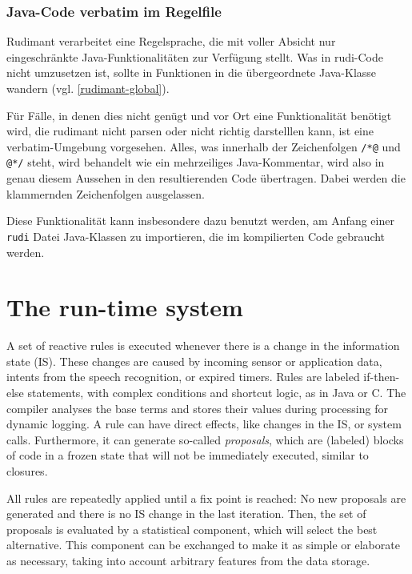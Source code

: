 \subsubsection{Java-Code verbatim im Regelfile} \label{sec:rudi-verbatim}

Rudimant verarbeitet eine Regelsprache, die mit voller Absicht nur
eingeschränkte Java-Funktionalitäten zur Verfügung stellt. Was in rudi-Code
nicht umzusetzen ist, sollte in Funktionen in die übergeordnete Java-Klasse
wandern (vgl. \ref{rudimant-global}).

Für Fälle, in denen dies nicht genügt und vor Ort eine Funktionalität benötigt
wird, die rudimant nicht parsen oder nicht richtig darstelllen kann, ist eine
verbatim-Umgebung vorgesehen. Alles, was innerhalb der Zeichenfolgen \verb|/*@|
und \verb|@*/| steht, wird behandelt wie ein mehrzeiliges Java-Kommentar, wird
also in genau diesem Aussehen in den resultierenden Code übertragen. Dabei
werden die klammernden Zeichenfolgen ausgelassen.

Diese Funktionalität kann insbesondere dazu benutzt werden, am Anfang einer
\texttt{rudi} Datei Java-Klassen zu importieren, die im kompilierten Code
gebraucht werden.

\section{The run-time system}

A set of reactive rules is executed whenever there is a change in the
information state (IS). These changes are caused by incoming sensor or
application data, intents from the speech recognition, or expired timers.
Rules are labeled if-then-else statements, with complex conditions and shortcut
logic, as in Java or C. The compiler analyses the base terms and stores their
values during processing for dynamic logging. A rule can have direct effects,
like changes in the IS, or system calls. Furthermore, it can generate so-called
\emph{proposals}, which are (labeled) blocks of code in a frozen state that
will not be immediately executed, similar to closures.

All rules are repeatedly applied until a fix point is reached: No new proposals
are generated and there is no IS change in the last iteration. Then, the set of
proposals is evaluated by a statistical component, which will select the best
alternative. This component can be exchanged to make it as simple or elaborate
as necessary, taking into account arbitrary features from the data storage.




